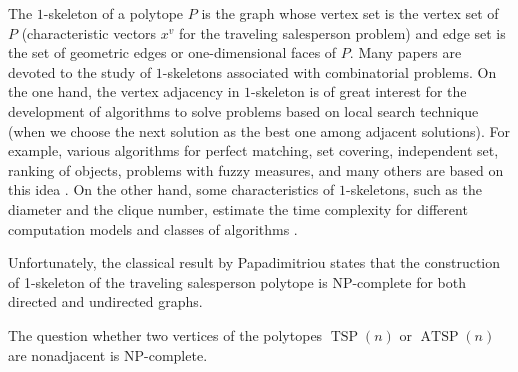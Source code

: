 \documentclass[runningheads]{llncs}
\DeclareMathOperator\TSP {TSP}
\DeclareMathOperator\ATSP {ATSP}
\begin{document}
The $1$-skeleton of a polytope $P$ is the graph whose vertex set is the vertex set of $P$ (characteristic vectors $x^v$ for the traveling salesperson problem) and edge set is the set of geometric edges or one-dimensional faces of $P$. Many papers are devoted to the study of $1$-skeletons associated with combinatorial problems. On the one hand, the vertex adjacency in $1$-skeleton is of great interest for the development of algorithms to solve problems based on local search technique (when we choose the next solution as the best one among adjacent solutions). For example, various algorithms for perfect matching, set covering, independent set, ranking of objects, problems with fuzzy measures, and many others are based on this idea \cite{Aguilera,Balinski,Chegireddy,Combarro,Gabow,Matsui}. On the other hand, some characteristics of $1$-skeletons, such as the diameter and the clique number, estimate the time complexity for different computation models and classes of algorithms \cite{Bondarenko,Bondarenko-Maksimenko,Bondarenko-Nikolaev-2017,Grotschel}.

Unfortunately, the classical result by Papadimitriou states that the construction of 1-skeleton of the traveling salesperson polytope is NP-complete for both directed and undirected graphs.
\begin{theorem} 
    The question whether two vertices of the polytopes $\TSP(n)$ or $\ATSP(n)$ are nonadjacent is NP-complete. 
\end{theorem}
\end{document}
